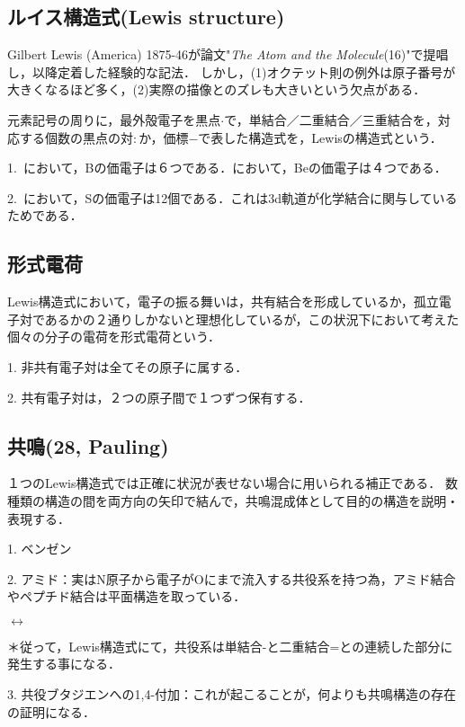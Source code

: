 \documentclass[uplatex, 12pt, dvipdfmx]{jsreport}
\begin{document}
\subsection{ルイス構造式(Lewis structure)}
Gilbert Lewis (America) 1875-46が論文"{\it The Atom and the Molecule}(16)"で提唱し，以降定着した経験的な記法．
しかし，(1)オクテット則の例外は原子番号が大きくなるほど多く，(2)実際の描像とのズレも大きいという欠点がある．

\begin{definition}
    元素記号の周りに，最外殻電子を黒点$\cdot$で，単結合／二重結合／三重結合を，対応する個数の黒点の対$:$か，価標$-$で表した構造式を，Lewisの構造式という．\rm{}
\end{definition}
\begin{example}[オクテット則の例外]\rm{}

    1.\, において，Bの価電子は６つである．において，Beの価電子は４つである．
    
    2.\, において，Sの価電子は12個である．これは3d軌道が化学結合に関与しているためである．
\end{example}

\subsection*{形式電荷}

\begin{definition}
    Lewis構造式において，電子の振る舞いは，共有結合を形成しているか，孤立電子対であるかの２通りしかないと理想化しているが，この状況下において考えた個々の分子の電荷を形式電荷という．

    1. 非共有電子対は全てその原子に属する．

    2. 共有電子対は，２つの原子間で１つずつ保有する．
\end{definition}

\subsection{共鳴(28, Pauling)}

１つのLewis構造式では正確に状況が表せない場合に用いられる補正である．
数種類の構造の間を両方向の矢印で結んで，共鳴混成体として目的の構造を説明・表現する．

\begin{example}
    1. ベンゼン

    2. アミド：実はN原子から電子がOにまで流入する共役系を持つ為，アミド結合やペプチド結合は平面構造を取っている．
    \begin{center}
         $\longleftrightarrow$ 
    \end{center}

    ＊従って，Lewis構造式にて，共役系は単結合-と二重結合=との連続した部分に発生する事になる．

    3. 共役ブタジエンへの1,4-付加：これが起こることが，何よりも共鳴構造の存在の証明になる．
\end{example}
\end{document}
